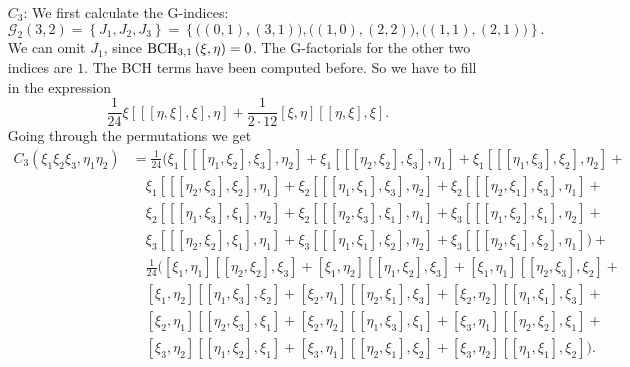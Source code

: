 \begin{itemize}
	\item[$C_3$:]
	We first calculate the G-indices:
	\begin{equation*}
		\mathcal{G}_2(3,2) 
		= 
		\left\{
			J_1, J_2, J_3
		\right\}
		=
		\left\{ 
			\big( (0,1), (3,1) \big), 
			\big( (1,0), (2,2) \big), 
			\big( (1,1), (2,1) \big) 
		\right\}.
	\end{equation*}
	We can omit $J_1$, since $\mathrm{BCH}_{3, 1}\left(\xi, \eta\right) = 0$. The 
	G-factorials for the other two indices are $1$. The BCH terms have been 
	computed before. So we have to fill in the expression
	\begin{equation*}
		\frac{1}{24} \xi [[[\eta, \xi], \xi], \eta] +
		\frac{1}{2 \cdot 12} [\xi, \eta] [[\eta, \xi], \xi].
	\end{equation*}
	Going through the permutations we get
	\begin{align*}
		C_3(\xi_1 \xi_2 \xi_3, \eta_1 \eta_2)
		& =
		\frac{1}{24}
		\big( 
			\xi_1[[[\eta_1, \xi_2], \xi_3], \eta_2] + 
			\xi_1[[[\eta_2, \xi_2], \xi_3], \eta_1] + 
			\xi_1[[[\eta_1, \xi_3], \xi_2], \eta_2] +
		\\
		& \quad
			\xi_1[[[\eta_2, \xi_3], \xi_2], \eta_1] + 
			\xi_2[[[\eta_1, \xi_1], \xi_3], \eta_2] + 
			\xi_2[[[\eta_2, \xi_1], \xi_3], \eta_1] +
		\\
		& \quad
			\xi_2[[[\eta_1, \xi_3], \xi_1], \eta_2] + 
			\xi_2[[[\eta_2, \xi_3], \xi_1], \eta_1] + 
			\xi_3[[[\eta_1, \xi_2], \xi_1], \eta_2] +
		\\
		& \quad
			\xi_3[[[\eta_2, \xi_2], \xi_1], \eta_1] + 
			\xi_3[[[\eta_1, \xi_1], \xi_2], \eta_2] + 
			\xi_3[[[\eta_2, \xi_1], \xi_2], \eta_1]
		\big) +
		\\
		& \quad
		\frac{1}{24}
		\big( 
			[\xi_1, \eta_1][[\eta_2, \xi_2], \xi_3] + 
			[\xi_1, \eta_2][[\eta_1, \xi_2], \xi_3] + 
			[\xi_1, \eta_1][[\eta_2, \xi_3], \xi_2] +
		\\
		& \quad
			[\xi_1, \eta_2][[\eta_1, \xi_3], \xi_2] + 
			[\xi_2, \eta_1][[\eta_2, \xi_1], \xi_3] + 
			[\xi_2, \eta_2][[\eta_1, \xi_1], \xi_3] +
		\\
		& \quad
			[\xi_2, \eta_1][[\eta_2, \xi_3], \xi_1] + 
			[\xi_2, \eta_2][[\eta_1, \xi_3], \xi_1] + 
			[\xi_3, \eta_1][[\eta_2, \xi_2], \xi_1] +
		\\
		& \quad
			[\xi_3, \eta_2][[\eta_1, \xi_2], \xi_1] + 
			[\xi_3, \eta_1][[\eta_2, \xi_1], \xi_2] + 
			[\xi_3, \eta_2][[\eta_1, \xi_1], \xi_2] 
		\big).
	\end{align*}


\end{itemize}
